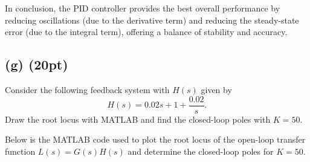 \documentclass[12pt]{article}
\begin{document}
In conclusion, the PID controller provides the best overall performance by reducing oscillations (due to the derivative term) and reducing the steady-state error (due to the integral term), offering a balance of stability and accuracy.

\newpage
\subsection*{(g) (20pt)}

Consider the following feedback system with \( H(s) \) given by
\[
H(s) = 0.02s + 1 + \frac{0.02}{s}.
\]
Draw the root locus with MATLAB and find the closed-loop poles with \( K = 50 \).

Below is the MATLAB code used to plot the root locus of the open-loop transfer function \( L(s) = G(s)H(s) \) and determine the closed-loop poles for \( K = 50 \).
\end{document}
